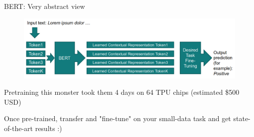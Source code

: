 \documentclass[12pt]{beamer}
\begin{document}
\begin{frame}{BERT: Very abstract view}
	
	\begin{figure}
		\includegraphics[width=\linewidth]{img/bert1.png}
	\end{figure}	

Pretraining this monster took them 4 days on 64 TPU chips
(estimated \$500 USD)

\bigskip

Once pre-trained, transfer and "fine-tune" on your small-data task and get state-of-the-art results :)


\end{frame}
\end{document}
